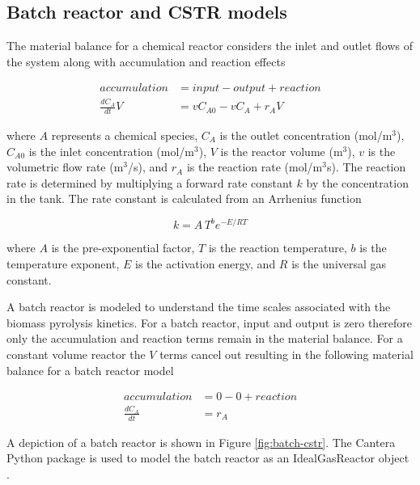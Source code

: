 \subsection{Batch reactor and CSTR models}

The material balance for a chemical reactor considers the inlet and outlet flows of the system along with accumulation and reaction effects

\begin{equation}
    \begin{aligned}
        accumulation &= input - output + reaction \\
        \frac{dC_A}{dt} V &= v C_{A0} - v C_A + r_A V
    \end{aligned}
\end{equation}

\noindent where $A$ represents a chemical species, $C_A$ is the outlet concentration (mol/m$^3$), $C_{A0}$ is the inlet concentration (mol/m$^3$), $V$ is the reactor volume (m$^3$), $v$ is the volumetric flow rate (m$^3$/s), and $r_A$ is the reaction rate (mol/m$^3$s). The reaction rate is determined by multiplying a forward rate constant $k$ by the concentration in the tank. The rate constant is calculated from an Arrhenius function

\begin{equation}
    \label{eq:rate-constant}
    k = A\,T^b e^{-E / RT}
\end{equation}

\noindent where $A$ is the pre-exponential factor, $T$ is the reaction temperature, $b$ is the temperature exponent, $E$ is the activation energy, and $R$ is the universal gas constant.

A batch reactor is modeled to understand the time scales associated with the biomass pyrolysis kinetics. For a batch reactor, input and output is zero therefore only the accumulation and reaction terms remain in the material balance. For a constant volume reactor the $V$ terms cancel out resulting in the following material balance for a batch reactor model

\begin{equation}
    \label{eq:batch-balance}
    \begin{aligned}
        accumulation &= 0 - 0 + reaction \\
        \frac{dC_A}{dt} &= r_A
    \end{aligned}
\end{equation}

\noindent A depiction of a batch reactor is shown in Figure \ref{fig:batch-cstr}. The Cantera Python package is used to model the batch reactor as an IdealGasReactor object \cite{Cantera-2018}.

